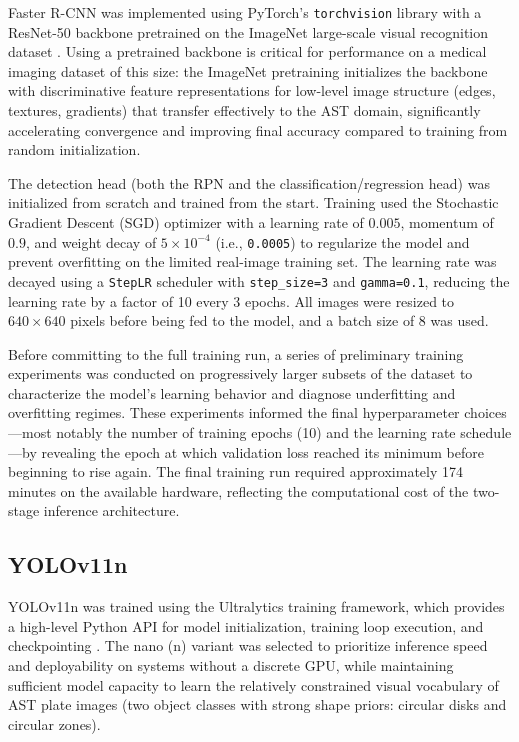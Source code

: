 Faster R-CNN was implemented using PyTorch's \texttt{torchvision} library with a ResNet-50
backbone pretrained on the ImageNet large-scale visual recognition dataset \cite{he2016deep}.
Using a pretrained backbone is critical for performance on a medical imaging dataset of this
size: the ImageNet pretraining initializes the backbone with discriminative feature representations
for low-level image structure (edges, textures, gradients) that transfer effectively to the
AST domain, significantly accelerating convergence and improving final accuracy compared to
training from random initialization.

The detection head (both the RPN and the classification/regression head) was initialized
from scratch and trained from the start. Training used the Stochastic Gradient Descent (SGD)
optimizer with a learning rate of $0.005$, momentum of $0.9$, and weight decay of
$5 \times 10^{-4}$ (i.e., \texttt{0.0005}) to regularize the model and prevent overfitting
on the limited real-image training set. The learning rate was decayed using a
\texttt{StepLR} scheduler with \texttt{step\_size=3} and \texttt{gamma=0.1}, reducing the
learning rate by a factor of 10 every 3 epochs. All images were resized to
$640 \times 640$ pixels before being fed to the model, and a batch size of 8 was used.

Before committing to the full training run, a series of preliminary training experiments was
conducted on progressively larger subsets of the dataset to characterize the model's learning
behavior and diagnose underfitting and overfitting regimes. These experiments informed the
final hyperparameter choices---most notably the number of training epochs (10) and the
learning rate schedule---by revealing the epoch at which validation loss reached its minimum
before beginning to rise again. The final training run required approximately 174 minutes on
the available hardware, reflecting the computational cost of the two-stage inference
architecture.

\subsection{YOLOv11n}

YOLOv11n was trained using the Ultralytics training framework, which provides a high-level
Python API for model initialization, training loop execution, and checkpointing
\cite{wang2024yolov11}. The nano (n) variant was selected to prioritize inference speed and
deployability on systems without a discrete GPU, while maintaining sufficient model capacity
to learn the relatively constrained visual vocabulary of AST plate images (two object classes
with strong shape priors: circular disks and circular zones).

